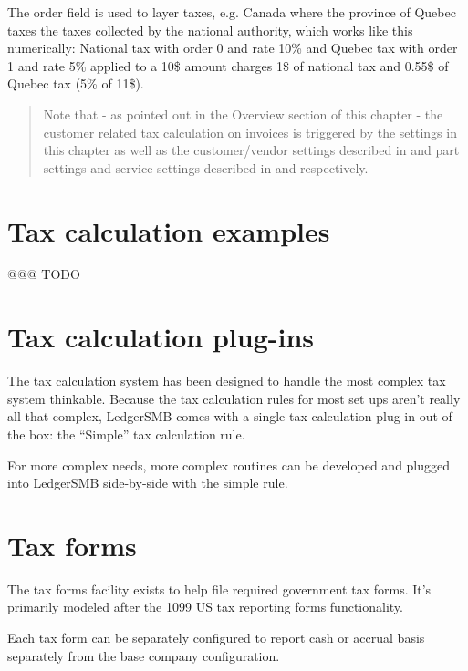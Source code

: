The order field is used to layer taxes, e.g. Canada where the province of Quebec taxes
the taxes collected by the national authority, which works like this numerically:
National tax with order 0 and rate 10\% and Quebec tax with order 1 and rate 5\%
applied to a 10\$ amount charges 1\$ of national tax and 0.55\$ of Quebec tax (5\% of 11\$).

\begin{quote}
Note that - as pointed out in the Overview section of this chapter - the \gls{customer} related
tax calculation on invoices is triggered by the settings in this chapter as well as
the customer/vendor settings described in 
and part settings and service settings described in  and
 respectively.
\end{quote}

\section{Tax calculation examples}
\label{sec-tax-calculation-examples}

@@@ TODO

\section{Tax calculation plug-ins}
\label{sec-tax-rule-plugins}

The tax calculation system has been designed to handle the most complex tax system
thinkable. Because the tax calculation rules for most set ups aren't really all that
complex, LedgerSMB comes with a single tax calculation plug in out of the box: the
``Simple'' tax calculation rule.

For more complex needs, more complex routines can be developed and plugged into
LedgerSMB side-by-side with the simple rule.


\section{Tax forms}
\label{sec-tax-taxforms}

The tax forms facility exists to help file required government tax forms. It's primarily modeled
after the 1099 US tax reporting forms functionality.

Each tax form can be separately configured to report cash or accrual basis separately from
the base company configuration.

